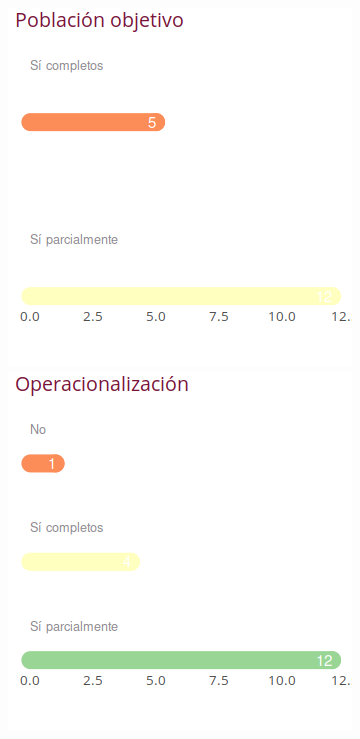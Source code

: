 \documentclass[10,a4paperpaper,]{article}
\begin{document}
\begin{figure}[!htb]
\begin{minipage}{0.3\textwidth}
    \includegraphics[width=1.0\linewidth]{figures/objetiv.png}
  \end{minipage}
    \begin{minipage}{0.3\textwidth}
    \centering
    \includegraphics[width=1.0\linewidth]{figures/Opera.png}
  \end{minipage}
\end{figure}
\end{document}
